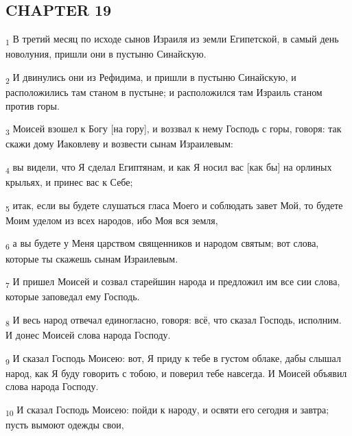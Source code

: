 \subsection{CHAPTER 19}
\begin{tcolorbox}
\textsubscript{1} В третий месяц по исходе сынов Израиля из земли Египетской, в самый день новолуния, пришли они в пустыню Синайскую.
\end{tcolorbox}
\begin{tcolorbox}
\textsubscript{2} И двинулись они из Рефидима, и пришли в пустыню Синайскую, и расположились там станом в пустыне; и расположился там Израиль станом против горы.
\end{tcolorbox}
\begin{tcolorbox}
\textsubscript{3} Моисей взошел к Богу [на гору], и воззвал к нему Господь с горы, говоря: так скажи дому Иаковлеву и возвести сынам Израилевым:
\end{tcolorbox}
\begin{tcolorbox}
\textsubscript{4} вы видели, что Я сделал Египтянам, и как Я носил вас [как бы] на орлиных крыльях, и принес вас к Себе;
\end{tcolorbox}
\begin{tcolorbox}
\textsubscript{5} итак, если вы будете слушаться гласа Моего и соблюдать завет Мой, то будете Моим уделом из всех народов, ибо Моя вся земля,
\end{tcolorbox}
\begin{tcolorbox}
\textsubscript{6} а вы будете у Меня царством священников и народом святым; вот слова, которые ты скажешь сынам Израилевым.
\end{tcolorbox}
\begin{tcolorbox}
\textsubscript{7} И пришел Моисей и созвал старейшин народа и предложил им все сии слова, которые заповедал ему Господь.
\end{tcolorbox}
\begin{tcolorbox}
\textsubscript{8} И весь народ отвечал единогласно, говоря: всё, что сказал Господь, исполним. И донес Моисей слова народа Господу.
\end{tcolorbox}
\begin{tcolorbox}
\textsubscript{9} И сказал Господь Моисею: вот, Я приду к тебе в густом облаке, дабы слышал народ, как Я буду говорить с тобою, и поверил тебе навсегда. И Моисей объявил слова народа Господу.
\end{tcolorbox}
\begin{tcolorbox}
\textsubscript{10} И сказал Господь Моисею: пойди к народу, и освяти его сегодня и завтра; пусть вымоют одежды свои,
\end{tcolorbox}

